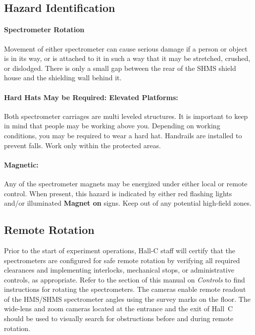 	
\begin{safetyen}{0}{0}
\subsection{Hazard Identification}
\paragraph{Spectrometer Rotation}

Movement of either spectrometer can cause serious damage if a person or 
object is in its way,
or is attached to it in such a way that it may be stretched, crushed, or dislodged. 
There is only a small gap between the rear of the SHMS shield house and the
shielding wall behind it. 

\paragraph{Hard Hats May be Required: Elevated Platforms:} 

Both spectrometer carriages are multi leveled structures. It is important to keep in
mind that people may be working above you.  Depending on working conditions, 
you may be required to wear a hard hat. 
Handrails are installed to prevent falls. Work only within the protected areas.

\paragraph{Magnetic:}

Any of the spectrometer magnets may be energized under either local or remote
control. When present, this hazard is indicated by either red flashing lights and/or
illuminated \textbf{Magnet on} signs. Keep out of any potential high-field zones.

\end{safetyen}

\subsection{Remote Rotation}

Prior to the start of experiment operations, Hall-C staff will certify that the spectrometers
are configured for safe remote rotation by verifying all required clearances and
implementing interlocks, mechanical stops, or administrative controls, as appropriate.
Refer to the section of this manual on \emph{Controls} to find instructions for
rotating the spectrometers. The cameras enable remote readout of the HMS/SHMS 
spectrometer angles using the survey marks on the floor.
The wide-lens and zoom cameras located at the entrance and
the exit of Hall~C should be used to visually search for obstructions
before and during remote rotation.


